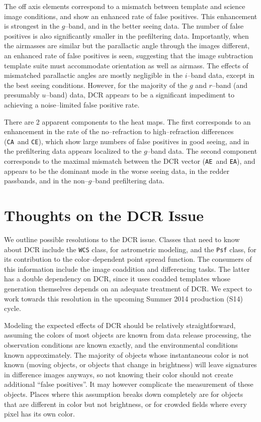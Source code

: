 \documentclass[prd, nofootinbib, floatfix, 11pt, tightenlines, times]{article}
\def\A{{\tt A}}
\def\C{{\tt C}}
\def\E{{\tt E}}
\begin{document}
The off axis elements correspond to a mismatch between template and
science image conditions, and show an enhanced rate of false
positives.  This enhancement is strongest in the $g$--band, and in the
better seeing data.  The number of false positives is also
significantly smaller in the prefiltering data.  Importantly, when the
airmasses are similar but the parallactic angle through the images
different, an enhanced rate of false positives is seen, suggesting
that the image subtraction template suite must accommodate orientation
as well as airmass.  The effects of mismatched parallactic angles are
mostly negligible in the $i$--band data, except in the best seeing
conditions.  However, for the majority of the $g$ and $r$--band (and
presumably $u$--band) data, DCR appears to be a significant impediment
to achieving a noise--limited false positive rate.

There are 2 apparent components to the heat maps.  The first
corresponds to an enhancement in the rate of the no--refraction to
high--refraction differences (\C\A\ and \C\E), which show large
numbers of false positives in good seeing, and in the prefiltering
data appears localized to the $g$--band data.  The second component
corresponds to the maximal mismatch between the DCR vector (\A\E\ and
\E\A), and appears to be the dominant mode in the worse seeing data,
in the redder passbands, and in the non--$g$--band prefiltering data.

\section{Thoughts on the DCR Issue}

We outline possible resolutions to the DCR issue.  Classes that need
to know about DCR include the {\tt WCS} class, for astrometric
modeling, and the {\tt Psf} class, for its contribution to the
color--dependent point spread function.  The consumers of this
information include the image coaddition and differencing tasks.  The
latter has a double dependency on DCR, since it uses coadded templates
whose generation themselves depends on an adequate treatment of DCR.
We expect to work towards this resolution in the upcoming Summer 2014
production (S14) cycle.  

Modeling the expected effects of DCR should be relatively
straightforward, assuming the colors of most objects are known from
data release processing, the observation conditions are known exactly,
and the environmental conditions known approximately.  The majority of
objects whose instantaneous color is not known (moving objects, or
objects that change in brightness) will leave signatures in difference
images anyways, so not knowing their color should not create
additional ``false positives''.  It may however complicate the
measurement of these objects.  Places where this assumption breaks
down completely are for objects that are different in color but not
brightness, or for crowded fields where every pixel has its own color.
\end{document}
